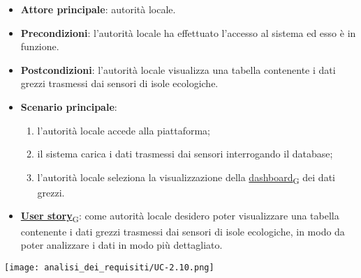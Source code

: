 \begin{itemize}
	\item \textbf{Attore principale}: autorità locale.
	\item \textbf{Precondizioni}: l'autorità locale ha effettuato l'accesso al sistema ed esso è in funzione.
	\item \textbf{Postcondizioni}: l'autorità locale visualizza una tabella contenente i dati grezzi trasmessi dai sensori di isole ecologiche.
	\item \textbf{Scenario principale}:
	      \begin{enumerate}
		      \item l'autorità locale accede alla piattaforma;
		      \item il sistema carica i dati trasmessi dai sensori interrogando il database;
		      \item l'autorità locale seleziona la visualizzazione della \href{https://7last.github.io/docs/rtb/documentazione-interna/glossario\#dashboard}{dashboard\textsubscript{G}} dei dati grezzi.
	      \end{enumerate}
	\item \href{https://7last.github.io/docs/rtb/documentazione-interna/glossario\#user-story}{\textbf{User story}\textsubscript{G}}:
	      come autorità locale desidero poter visualizzare una tabella contenente i dati grezzi trasmessi dai sensori di isole ecologiche,
	      in modo da poter analizzare i dati in modo più dettagliato.
\end{itemize}
\begin{center}
	\texttt{[image: analisi\_dei\_requisiti/UC-2.10.png]}
\end{center}

\newpage

